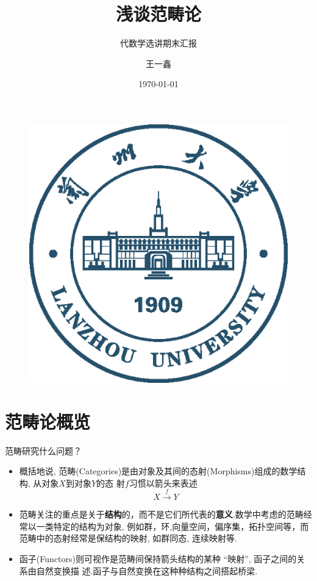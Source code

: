 \documentclass{beamer}
\author{王一鑫}
\title{浅谈范畴论}
\subtitle{代数学选讲期末汇报}
\institute{兰州大学}
\date{\today}
\begin{document}
	
	\kaishu
	\begin{frame}
		\titlepage
		\begin{figure}[htpb]
			\begin{center}
				\includegraphics[width=0.2\linewidth]{pic/Lanzhou_University_Logo.eps}
			\end{center}
		\end{figure}
	\end{frame}
	
	\begin{frame}
		\tableofcontents[sectionstyle=show,subsectionstyle=show/shaded/hide,subsubsectionstyle=show/shaded/hide]
	\end{frame}
	
	
	\section{范畴论概览}
	
	\begin{frame}{范畴研究什么问题？}
		\begin{itemize}[<+->]
			\item 概括地说, 范畴(Categories)是由对象及其间的态射(Morphisms)组成的数学结构, 从对象$X$到对象$Y$的态
			射$f$习惯以箭头来表述\[ X\stackrel{f}{\longrightarrow}Y \]
			\item 范畴关注的重点是关于\textbf{结构}的，而不是它们所代表的\textbf{意义}.数学中考虑的范畴经常以一类特定的结构为对象, 例如群，环,向量空间，偏序集，拓扑空间等，而范畴中的态射经常是保结构的映射, 如群同态, 连续映射等.
			\item 函子(Functors)则可视作是范畴间保持箭头结构的某种 “映射”, 函子之间的关系由自然变换描
			述.函子与自然变换在这种种结构之间搭起桥梁.
		\end{itemize}
	\end{frame}
	
\end{document}

